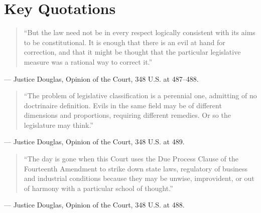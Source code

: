 \documentclass[12pt]{article}
\begin{document}
\section{Key Quotations}

\begin{quote}
``But the law need not be in every respect logically consistent with its aims to be constitutional. It is enough that there is an evil at hand for correction, and that it might be thought that the particular legislative measure was a rational way to correct it.''
\end{quote}
\noindent --- Justice Douglas, Opinion of the Court, 348 U.S. at 487--488.

\begin{quote}
``The problem of legislative classification is a perennial one, admitting of no doctrinaire definition. Evils in the same field may be of different dimensions and proportions, requiring different remedies. Or so the legislature may think.''
\end{quote}
\noindent --- Justice Douglas, Opinion of the Court, 348 U.S. at 489.

\begin{quote}
``The day is gone when this Court uses the Due Process Clause of the Fourteenth Amendment to strike down state laws, regulatory of business and industrial conditions because they may be unwise, improvident, or out of harmony with a particular school of thought.''
\end{quote}
\noindent --- Justice Douglas, Opinion of the Court, 348 U.S. at 488.
\end{document}
